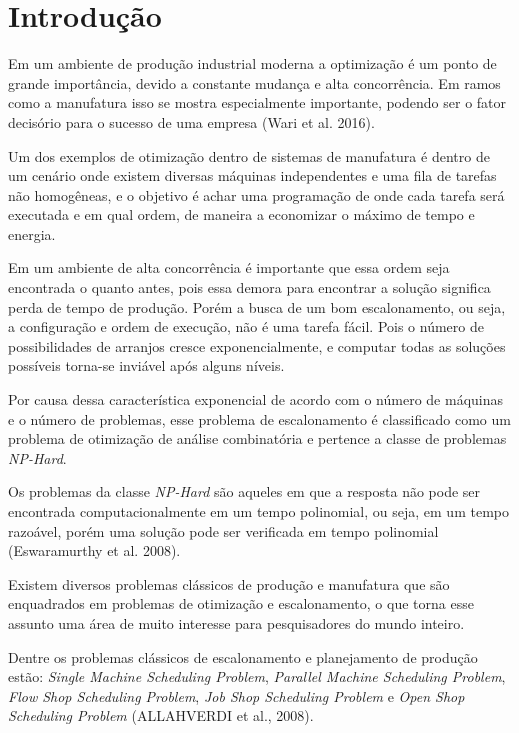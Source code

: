\chapter{Introdução}
Em um ambiente de produção industrial moderna a optimização é um ponto de grande importância, devido a constante mudança e alta concorrência. Em ramos como a manufatura isso se mostra especialmente importante, podendo ser o fator decisório para o sucesso de uma empresa (Wari et al. 2016).\newline

Um dos exemplos de otimização dentro de sistemas de manufatura é dentro de um cenário onde existem diversas máquinas independentes e uma fila de tarefas não homogêneas, e o objetivo é achar uma programação de onde cada tarefa será executada e em qual ordem, de maneira a economizar o máximo de tempo e energia.\newline

Em um ambiente de alta concorrência é importante que essa ordem seja encontrada o quanto antes, pois essa demora para encontrar a solução significa perda de tempo de produção. Porém a busca de um bom escalonamento, ou seja, a configuração e ordem de execução, não é uma tarefa fácil. Pois o número de possibilidades de arranjos cresce exponencialmente, e computar todas as soluções possíveis torna-se inviável após alguns níveis. \newline

Por causa dessa característica exponencial de acordo com o número de máquinas e o número de problemas, esse problema de escalonamento é classificado como um problema de otimização de análise combinatória e pertence a classe de problemas \textit{NP-Hard}. \newline

Os problemas da classe \textit{NP-Hard} são aqueles em que a resposta não pode ser encontrada computacionalmente em um tempo polinomial, ou seja, em um tempo razoável, porém uma solução pode ser verificada em tempo polinomial (Eswaramurthy et al. 2008).\newline

Existem diversos problemas clássicos de produção e manufatura que são enquadrados em problemas de otimização e escalonamento, o que torna esse assunto uma área de muito interesse para pesquisadores do mundo inteiro.\newline

Dentre os problemas clássicos de escalonamento e planejamento de produção estão: 
\textit{Single Machine Scheduling Problem}, 
\textit{Parallel Machine Scheduling Problem}, 
\textit{Flow Shop Scheduling Problem}, 
\textit{Job Shop Scheduling Problem} e 
\textit{Open Shop Scheduling Problem} 
(ALLAHVERDI et al., 2008).\newline

